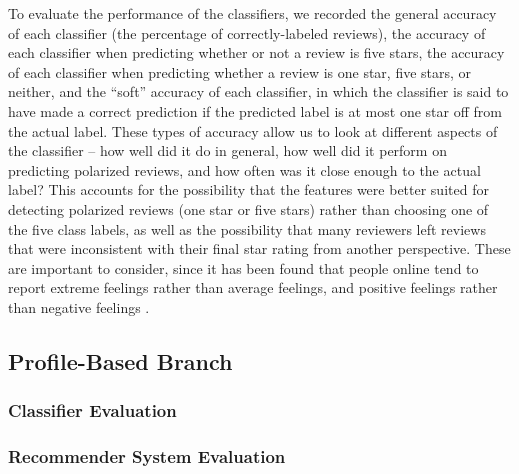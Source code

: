 To evaluate the performance of the classifiers, we recorded the general accuracy of each classifier (the percentage of correctly-labeled reviews), the accuracy of each classifier when predicting whether or not a review is five stars, the accuracy of each classifier when predicting whether a review is one star, five stars, or neither, and the ``soft'' accuracy of each classifier, in which the classifier is said to have made a correct prediction if the predicted label is at most one star off from the actual label. These types of accuracy allow us to look at different aspects of the classifier -- how well did it do in general, how well did it perform on predicting polarized reviews, and how often was it close enough to the actual label? This accounts for the possibility that the features were better suited for detecting polarized reviews (one star or five stars) rather than choosing one of the five class labels, as well as the possibility that many reviewers left reviews that were inconsistent with their final star rating from another perspective. These are important to consider, since it has been found that people online tend to report extreme feelings rather than average feelings, and positive feelings rather than negative feelings \cite{imbalance}.

\subsection{Profile-Based Branch}

\subsubsection{Classifier Evaluation}

\subsubsection{Recommender System Evaluation}